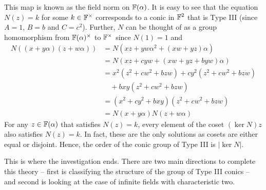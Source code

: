 This map is known as the field norm on $\mathbb{F}(\alpha)$. It is easy to see that the
equation $N(z)=k$ for some $k\in\mathbb{F}^\times$ corresponds to a conic in $\mathbb{F}^2$ that
is Type III (since $A=1$, $B=b$ and $C=c^2$). Further, $N$ can be thought of as a
group homomorphism from $\mathbb{F}(\alpha)^\times$ to $\mathbb{F}^\times$ since $N(1)=1$ and
\begin{align*}
    N((x+y\alpha)(z+w\alpha)) &= N(xz+yw\alpha^2+(xw+yz)\alpha) \\
                              &= N(xz+cyw+(xw+yz+byw)\alpha) \\
                              &= x^2 (z^2 + cw^2 + bzw) + cy^2 (z^2 + cw^2 + bzw) \\
                              &\quad+ bxy (z^2 + cw^2 + bzw) \\
                              &= (x^2 + cy^2 + bxy) (z^2 + cw^2 + b zw) \\
                              &= N(x+y\alpha)N(z+w\alpha)
\end{align*}
For any $z\in\mathbb{F}(\alpha)$ that satisfies $N(z)=k$, every element of the coset
$(\ker N)z$ also satisfies $N(z)=k$. In fact, these are the only solutions as
cosets are either equal or disjoint. Hence, the order of the conic group of Type
III is $|\ker N|$.

\vspace{1ex}

This is where the investigation ends. There are two main directions to complete
this theory -- first is classifying the structure of the group of Type III conics
-- and second is looking at the case of infinite fields with characteristic two.
